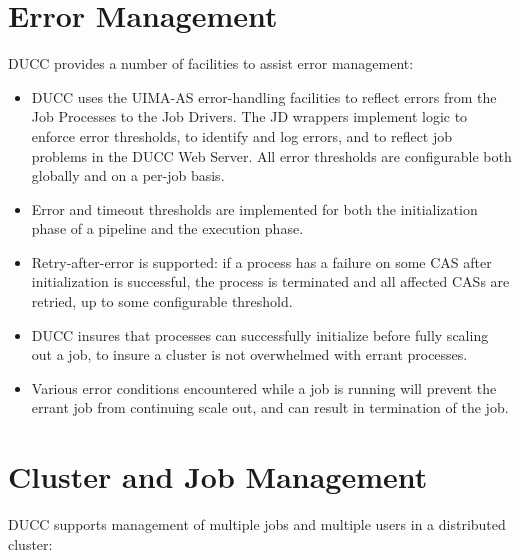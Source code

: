   
    \section{Error Management }
    DUCC provides a number of facilities to assist error management:
    
    \begin{itemize}
      \item DUCC uses the UIMA-AS error-handling facilities to reflect errors from the Job Processes
        to the Job Drivers. The JD wrappers implement logic to enforce error thresholds, to identify
        and log errors, and to reflect job problems in the DUCC Web Server.  All error thresholds are
        configurable both globally and on a per-job basis.

      \item Error and timeout thresholds are implemented for both the initialization phase of a pipeline
        and the execution phase.
    
      \item Retry-after-error is supported: if a process has a failure on some CAS after
        initialization is successful, the process is terminated and all affected CASs are retried, up to some
        configurable threshold.

      \item DUCC insures that processes can successfully initialize before fully scaling out a job,
        to insure a cluster is not overwhelmed with errant processes.

      \item Various error conditions encountered  while a job is running will prevent the errant job
        from continuing scale out, and can result in termination of the job.
      \end{itemize}
      
    \section{Cluster and Job Management}
    DUCC supports  management of multiple jobs and multiple users in a distributed cluster:


